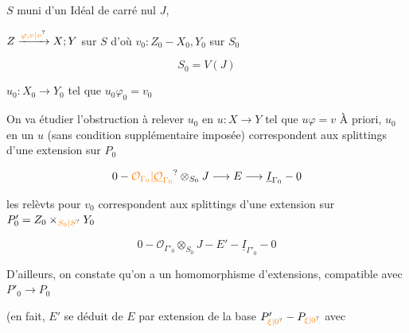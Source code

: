 
$S$  muni d'un Idéal  de carré nul $J$,

$Z\xrightarrow{\unsure{\varphi,v|v}}X;Y$ sur $S$ d'où $v_0:Z_0\mathbin{-}X_0,Y_0$ sur $S_0$

\[
S_0=V(J)
\]

$u_0:X_0\to Y_0$ tel que $u_0\varphi_0=v_0$

On va étudier l'obstruction à relever $u_0$ en $u:X\to Y$ tel que $u\varphi=v$ À priori,  $u_0$ en un $u$ (sans condition supplémentaire imposée) correspondent aux splittings d'une extension sur $P_0$

\[
0\mathbin{-}\unsure{\mathcal O_{\Gamma_0}|\underline{\mathcal O}_{\Gamma_0}}\otimes_{S_0}J\longrightarrow E\longrightarrow\underline I_{\Gamma_0}\mathbin{-}0
\]



les relèvts pour $v_0$ correspondent aux splittings d'une extension  sur $P'_0=Z_0\times_{\unsure{S_0|S}}Y_0$

\[
0\mathbin{-}\mathcal O_{\Gamma'_0}\otimes_{S_0}J\mathbin{-}E'\mathbin{-}\underline I_{\Gamma'_0}\mathbin{-}0
\]

D'ailleurs, on constate qu'on a un homomorphisme d'extensions, compatible avec $P'_0\to P_0$


(en fait, $E'$ se déduit de $E$ par extension de la base $P'_{\unsure{\xi|0}}\mathbin{-}P_{\unsure{\xi|0}}$  avec


